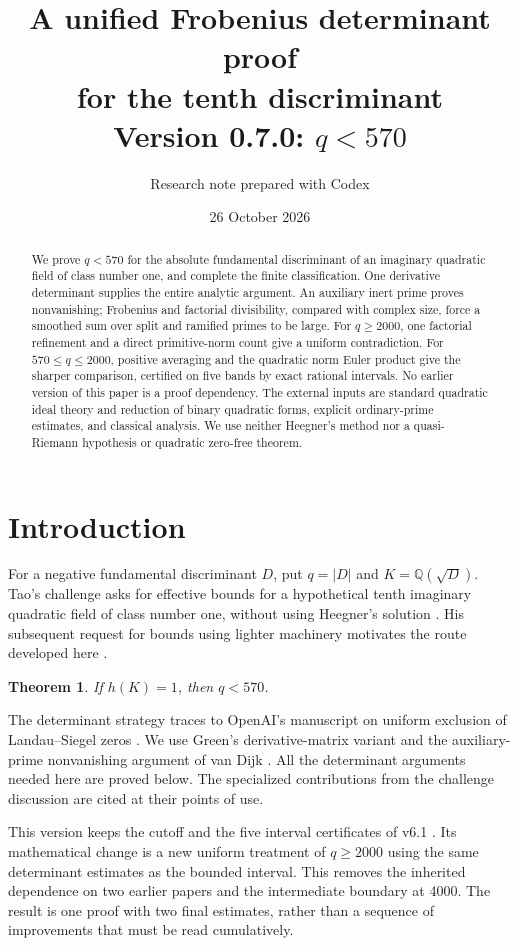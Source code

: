 \documentclass[11pt]{article}
\title{A unified Frobenius determinant proof\\for the tenth discriminant\\
\large Version 0.7.0: \(q<570\)}
\author{Research note prepared with Codex}
\date{26 October 2026}
\newtheorem{theorem}{Theorem}
\newcommand{\Q}{\mathbb Q}
\begin{document}
\maketitle

\begin{abstract}
We prove \(q<570\) for the absolute fundamental discriminant of an
imaginary quadratic field of class number one, and complete the finite
classification. One derivative determinant supplies the entire analytic
argument. An auxiliary inert prime proves nonvanishing; Frobenius and
factorial divisibility, compared with complex size, force a smoothed sum
over split and ramified primes to be large. For \(q\ge2000\), one
factorial refinement and a direct primitive-norm count give a uniform
contradiction. For \(570\le q\le2000\), positive averaging and the
quadratic norm Euler product give the sharper comparison, certified on
five bands by exact rational intervals. No earlier version of this paper
is a proof dependency. The external inputs are standard quadratic ideal
theory and reduction of binary quadratic forms, explicit ordinary-prime
estimates, and classical analysis. We use neither Heegner's method nor
a quasi-Riemann hypothesis or quadratic zero-free theorem.
\end{abstract}

\section{Introduction}
For a negative fundamental discriminant \(D\), put \(q=|D|\) and
\(K=\Q(\sqrt D)\). Tao's challenge asks for effective bounds for a
hypothetical tenth imaginary quadratic field of class number one,
without using Heegner's solution \cite{tao}. His subsequent request for
bounds using lighter machinery motivates the route developed here
\cite{taocomment}.

\begin{theorem}\label{main}
If \(h(K)=1\), then \(q<570\).
\end{theorem}

The determinant strategy traces to OpenAI's manuscript on uniform
exclusion of Landau--Siegel zeros \cite{openai}. We use Green's
derivative-matrix variant \cite{green} and the auxiliary-prime
nonvanishing argument of van Dijk \cite{vandijk}. All the determinant
arguments needed here are proved below. The specialized contributions
from the challenge discussion are cited at their points of use.

This version keeps the cutoff and the five interval certificates of
v6.1 \cite{v6}. Its mathematical change is a new uniform treatment of
\(q\ge2000\) using the same determinant estimates as the bounded
interval. This removes the inherited dependence on two earlier papers
and the intermediate boundary at 4000. The result is one proof with
two final estimates, rather than a sequence of improvements that must
be read cumulatively.
\end{document}
